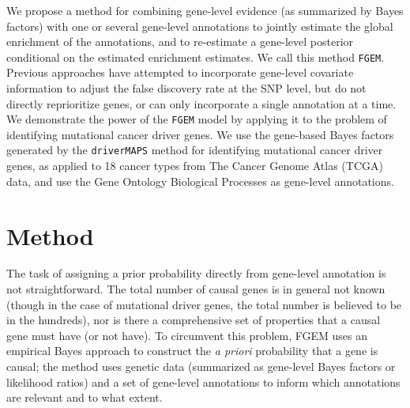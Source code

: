 We propose a method for combining gene-level evidence (as summarized by Bayes factors) with one or several gene-level annotations to jointly estimate the global enrichment of the annotations, and to re-estimate a gene-level posterior conditional on the estimated enrichment estimates. We call this method \texttt{FGEM}.  Previous approaches have attempted to incorporate gene-level covariate information to adjust the false discovery rate at the SNP level\cite{Zablocki_2014}, but do not directly reprioritize genes, or can only incorporate a single annotation at a time\cite{rss-e}.  We demonstrate the power of the \texttt{FGEM} model by applying it to the problem of identifying mutational cancer driver genes. We use the gene-based Bayes factors generated by the \texttt{driverMAPS} method for identifying mutational cancer driver genes, as applied to 18 cancer types from The Cancer Genome Atlas (TCGA) data\cite{TCGA}\cite{drivermaps}, and use the Gene Ontology Biological Processes as gene-level annotations.


\section{Method}\label{sec:org4822ac5}

The task of assigning a prior probability directly from gene-level annotation is not straightforward.  The total number of causal genes is in general not known (though in the case of mutational driver genes, the total number is believed to be in the hundreds\cite{Bailey_2018}), nor is there a comprehensive set of properties that a causal gene must have (or not have).  To circumvent this problem, FGEM uses an empirical Bayes approach to construct the \emph{a priori} probability that a gene is causal; the method uses genetic data (summarized as gene-level Bayes factors or likelihood ratios) and a set of gene-level annotations to inform which annotations are relevant and to what extent.
